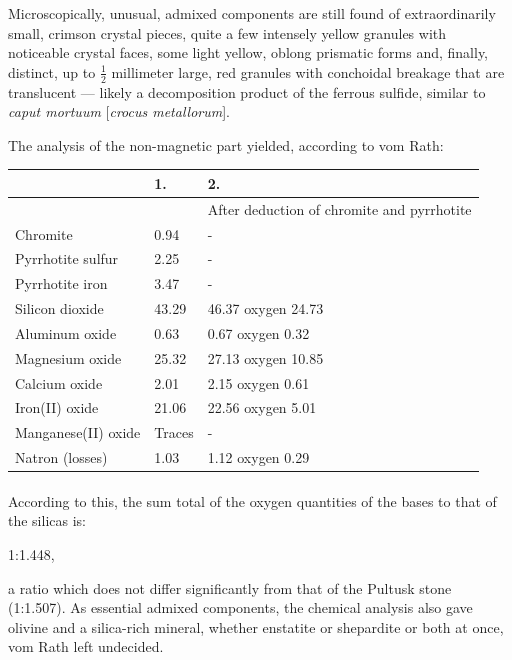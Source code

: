 \documentclass[a4paper, 12pt, oneside]{article}
\begin{document}
Microscopically, unusual, admixed components are still found of extraordinarily small, crimson crystal pieces, quite a few intensely yellow granules with noticeable crystal faces, some light yellow, oblong prismatic forms and, finally, distinct, up to $\frac{1}{2}$ millimeter large, red granules with conchoidal breakage that are translucent --- likely a decomposition product of the ferrous sulfide, similar to \emph{caput mortuum} [\emph{crocus metallorum}].

The analysis of the non-magnetic part yielded, according to vom Rath:
\begin{center}
   \tiny
    \begin{tabular}{ |p{1.4cm}|p{1.4cm}|p{2.0cm}| }
        \hline
        & 1. & 2.\\\hline
        & & After deduction of chromite and pyrrhotite\\\hline
        Chromite & 0.94 & -\\\hline
        Pyrrhotite sulfur & 2.25 & -\\\hline
        Pyrrhotite iron & 3.47 & -\\\hline
        Silicon dioxide & 43.29 & 46.37 oxygen 24.73\\\hline
        Aluminum oxide & 0.63 & 0.67 oxygen 0.32\\\hline
        Magnesium oxide & 25.32 & 27.13 oxygen 10.85\\\hline
        Calcium oxide & 2.01 & 2.15 oxygen 0.61\\\hline
        Iron(II) oxide & 21.06 & 22.56 oxygen 5.01\\\hline
        Manganese(II) oxide & Traces & -\\\hline
        Natron (losses) & 1.03 & 1.12 oxygen 0.29\\
        \hline
    \end{tabular}
\end{center}
\paragraph*{}
According to this, the sum total of the oxygen quantities of the bases to that of the silicas is:

1:1.448,

a ratio which does not differ significantly from that of the Pultusk stone (1:1.507). As essential admixed components, the chemical analysis also gave olivine and a silica-rich mineral, whether enstatite or shepardite or both at once, vom Rath left undecided.
\end{document}
